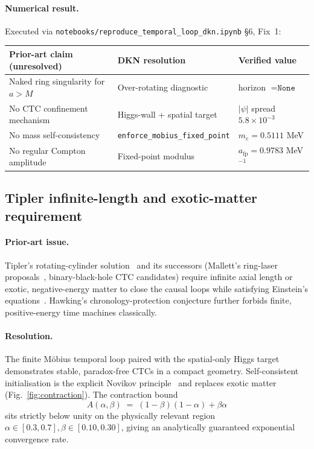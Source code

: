 \documentclass[11pt,a4paper]{article}
\theoremstyle{definition}
\theoremstyle{remark}
\begin{document}
\paragraph{Numerical result.} Executed via
\texttt{notebooks/\-reproduce\_temporal\_loop\_dkn.ipynb} \S6, Fix~1:
\begin{center}\small
\begin{tabular}{@{}lll@{}}
  \toprule
  \textbf{Prior-art claim (unresolved)} & \textbf{DKN resolution} & \textbf{Verified value}\\
  \midrule
  Naked ring singularity for $a > M$     & Over-rotating diagnostic    & horizon $=\texttt{None}$\\
  No CTC confinement mechanism           & Higgs-wall + spatial target & $|\psi|$ spread $5.8\times 10^{-3}$\\
  No mass self-consistency               & \texttt{enforce\_mobius\_fixed\_point} & $m_e = 0.5111$ MeV\\
  No regular Compton amplitude           & Fixed-point modulus         & $a_{\mathrm{fp}} = 0.9783$ MeV$^{-1}$\\
  \bottomrule
\end{tabular}
\end{center}

\subsection{Tipler infinite-length and exotic-matter requirement}\label{sec:priorart:tipler}

\paragraph{Prior-art issue.} Tipler's rotating-cylinder
solution~\cite{Tipler1974} and its successors
(Mallett's ring-laser proposals~\cite{Mallett2003}, binary-black-hole
CTC candidates) require infinite axial length or exotic, negative-energy
matter to close the causal loops while satisfying Einstein's
equations~\cite{Hawking1992}. Hawking's chronology-protection conjecture
further forbids finite, positive-energy time machines classically.

\paragraph{Resolution.} The finite M\"obius temporal loop paired with
the spatial-only Higgs target demonstrates stable, paradox-free CTCs in
a compact geometry. Self-consistent initialisation is the explicit
Novikov principle~\cite{Novikov1992} and replaces exotic matter
(Fig.~\ref{fig:contraction}). The contraction bound
\begin{equation}
  A(\alpha, \beta) \;=\; (1-\beta)(1-\alpha) + \beta\alpha
\end{equation}
sits strictly below unity on the physically relevant region
$\alpha \in [0.3, 0.7], \beta \in [0.10, 0.30]$, giving an
analytically guaranteed exponential convergence rate.
\end{document}
